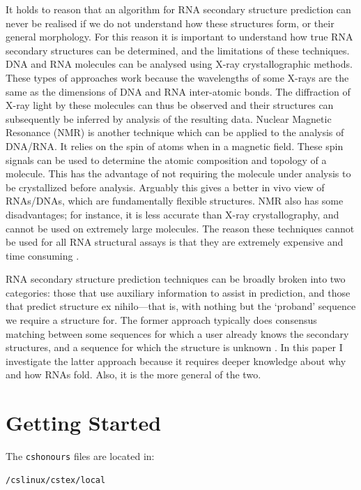 \documentclass{cshonours}
\begin{document}
It holds to reason that an algorithm for RNA secondary structure prediction can never be realised if we do not understand how these structures form, or their general morphology. For this reason it is important to understand how true RNA secondary structures can be determined, and the limitations of these techniques. DNA and RNA molecules can be analysed using X-ray crystallographic methods. These types of approaches work because the wavelengths of some X-rays are the same as the dimensions of DNA and RNA inter-atomic bonds. The diffraction of X-ray light by these molecules can thus be observed and their structures can subsequently be inferred by analysis of the resulting data. Nuclear Magnetic Resonance (NMR) is another technique which can be applied to the analysis of DNA/RNA. It relies on the spin of atoms when in a magnetic field. These spin signals can be used to determine the atomic composition and topology of a molecule. This has the advantage of not requiring the molecule under analysis to be crystallized before analysis. Arguably this gives a better in vivo view of RNAs/DNAs, which are fundamentally flexible structures. NMR also has some disadvantages; for instance, it is less accurate than X-ray crystallography, and cannot be used on extremely large molecules. The reason these techniques cannot be used for all RNA structural assays is that they are extremely expensive and time consuming \cite{neidle2010principles}.


RNA secondary structure prediction techniques can be broadly broken into two categories: those that use auxiliary information to assist in prediction, and those that predict structure ex nihilo---that is, with nothing but the `proband' sequence we require a structure for. The former approach typically does consensus matching between some sequences for which a user already knows the secondary structures, and a sequence for which the structure is unknown \cite{hofacker2008rna}. In this paper I investigate the latter approach because it requires deeper knowledge about why and how RNAs fold. Also, it is the more general of the two.



\section{Getting Started}

The {\tt cshonours} files are located in:
\begin{verbatim}
/cslinux/cstex/local
\end{verbatim}
\end{document}
